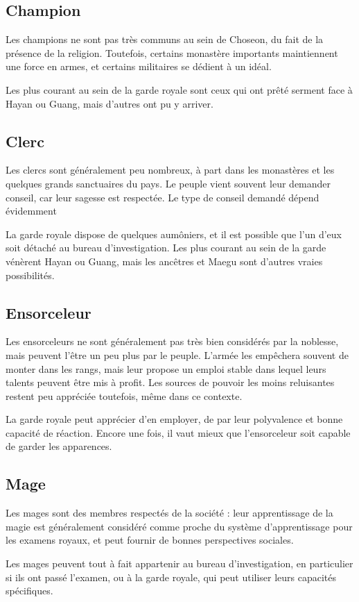 \documentclass[10pt,a4paper]{book}
\newcommand{\nomroyaume}{Choseon}
\begin{document}
\subsection{Champion}
Les champions ne sont pas très communs au sein de \nomroyaume, du fait de la présence de la religion. Toutefois, certains monastère importants maintiennent une force en armes, et certains militaires se dédient à un idéal.

Les plus courant au sein de la garde royale sont ceux qui ont prêté serment face à Hayan ou Guang, mais d'autres ont pu y arriver.
\subsection{Clerc}
Les clercs sont généralement peu nombreux, à part dans les monastères et les quelques grands sanctuaires du pays. Le peuple vient souvent leur demander conseil, car leur sagesse est respectée. Le type de conseil demandé dépend évidemment 

 La garde royale dispose de quelques aumôniers, et il est possible que l'un d'eux soit détaché au bureau d'investigation. Les plus courant au sein de la garde vénèrent Hayan ou Guang, mais les ancêtres et Maegu sont d'autres vraies possibilités.
\subsection{Ensorceleur}
Les ensorceleurs ne sont généralement pas très bien considérés par la noblesse, mais peuvent l'être un peu plus par le peuple. L'armée les empêchera souvent de monter dans les rangs, mais leur propose un emploi stable dans lequel leurs talents peuvent être mis à profit. Les sources de pouvoir les moins reluisantes restent peu appréciée toutefois, même dans ce contexte.

La garde royale peut apprécier d'en employer, de par leur polyvalence et bonne capacité de réaction. Encore une fois, il vaut mieux que l'ensorceleur soit capable de garder les apparences.
\subsection{Mage}
Les mages sont des membres respectés de la société : leur apprentissage de la magie est généralement considéré comme proche du système d'apprentissage pour les examens royaux, et peut fournir de bonnes perspectives sociales.

Les mages peuvent tout à fait appartenir au bureau d'investigation, en particulier si ils ont passé l'examen, ou à la garde royale, qui peut utiliser leurs capacités spécifiques.
\end{document}
